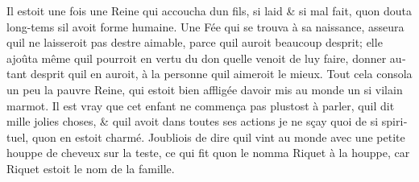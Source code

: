 \documentclass[14pt,a4paper]{memoir}
\begin{document}
\begin{otherlanguage}{french}
Il estoit une fois une Reine qui accoucha d\textquotesingle un fils, si
laid \& si mal fait, qu\textquotesingle on douta long-tems
s\textquotesingle il avoit forme humaine. Une Fée qui se trouva à sa
naissance, asseura qu\textquotesingle il ne laisseroit pas
d\textquotesingle estre aimable, parce qu\textquotesingle il auroit
beaucoup d\textquotesingle esprit; elle ajoûta même
qu\textquotesingle il pourroit en vertu du don qu\textquotesingle elle
venoit de luy faire, donner autant d\textquotesingle esprit
qu\textquotesingle il en auroit, à la personne qu\textquotesingle il
aimeroit le mieux. Tout cela consola un peu la pauvre Reine, qui estoit
bien affligée d\textquotesingle avoir mis au monde un si vilain marmot.
Il est vray que cet enfant ne commença pas plustost à parler,
qu\textquotesingle il dit mille jolies choses, \& qu\textquotesingle il
avoit dans toutes ses actions je ne sçay quoi de si spirituel,
qu\textquotesingle on en estoit charmé. J\textquotesingle oubliois de
dire qu\textquotesingle il vint au monde avec une petite houppe de
cheveux sur la teste, ce qui fit qu\textquotesingle on le nomma Riquet à
la houppe, car Riquet estoit le nom de la famille.


\end{otherlanguage}
\end{document}
